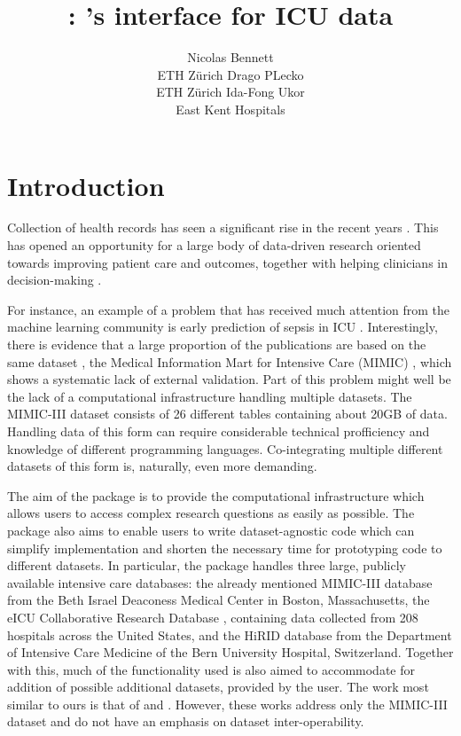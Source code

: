 \documentclass[
]{jss}
\author{
Nicolas Bennett\\ETH Zürich \And Drago PLecko\\ETH Zürich \And Ida-Fong Ukor\\East Kent Hospitals
}
\title{\pkg{ricu}: \proglang{R}'s interface for ICU data}
\begin{document}
\hypertarget{introduction}{%
\section{Introduction}\label{introduction}}

Collection of health records has seen a significant rise in the recent
years \cite{evans2016electronic}. This has opened an opportunity for a
large body of data-driven research oriented towards improving patient
care and outcomes, together with helping clinicians in decision-making
\cite{jiang2017artificial}.

For instance, an example of a problem that has received much attention
from the machine learning community is early prediction of sepsis in ICU
\cite{desautels2016prediction, nemati2018interpretable, futoma2017improved, kam2017learning}.
Interestingly, there is evidence that a large proportion of the
publications are based on the same dataset \cite{fleuren2019machine},
the Medical Information Mart for Intensive Care (MIMIC)
\cite{johnson2016mimic}, which shows a systematic lack of external
validation. Part of this problem might well be the lack of a
computational infrastructure handling multiple datasets. The MIMIC-III
dataset consists of 26 different tables containing about 20GB of data.
Handling data of this form can require considerable technical
profficiency and knowledge of different programming languages.
Co-integrating multiple different datasets of this form is, naturally,
even more demanding.

The aim of the  package is to provide the computational
infrastructure which allows users to access complex research questions
as easily as possible. The package also aims to enable users to write
dataset-agnostic code which can simplify implementation and shorten the
necessary time for prototyping code to different datasets. In
particular, the package handles three large, publicly available
intensive care databases: the already mentioned MIMIC-III database from
the Beth Israel Deaconess Medical Center in Boston, Massachusetts, the
eICU Collaborative Research Database \cite{pollard2018eicu}, containing
data collected from 208 hospitals across the United States, and the
HiRID database \cite{faltys2020hirid} from the Department of Intensive
Care Medicine of the Bern University Hospital, Switzerland. Together
with this, much of the functionality used is also aimed to accommodate
for addition of possible additional datasets, provided by the user. The
work most similar to ours is that of \cite{adibuzzaman2016closing} and
\cite{wang2020mimic}. However, these works address only the MIMIC-III
dataset and do not have an emphasis on dataset inter-operability.
\end{document}
